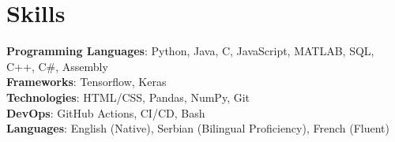 \section{Skills}
    \begin{itemize}[leftmargin=0.15in, label={}]
	\small{\item{
		\textbf{Programming Languages}{: Python, Java, C, JavaScript, MATLAB, SQL, C++, C\#, Assembly} \\
		\textbf{Frameworks}{: Tensorflow, Keras} \\
		\textbf{Technologies}{: HTML/CSS, Pandas, NumPy, Git} \\
		\textbf{DevOps}{: GitHub Actions, CI/CD, Bash} \\
		\textbf{Languages}{: English (Native), Serbian (Bilingual Proficiency), French (Fluent)} \\

	}}
    \end{itemize}
